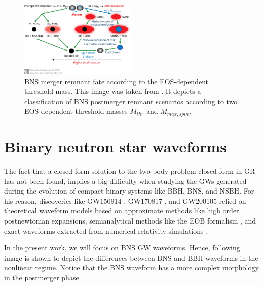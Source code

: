 \begin{figure}[hbt!]
\begin{center}
\includegraphics[width=0.5\textwidth, angle=0]{images/shi.jpeg}
\captionsetup{width=0.8\textwidth}
\caption[BNS merger remnant fate according to the EOS-dependent threshold mass]{BNS merger remnant fate according to the EOS-dependent threshold mass. This image was taken from \cite{Shibata:2019wef}. It depicts a classification of BNS postmerger remnant scenarios according to two EOS-dependent threshold masses $M_{thr}$ and $M_{max,spin}$.}
\label{BNS-out}
\end{center}
\end{figure}
\FloatBarrier

\newpage

\section{Binary neutron star waveforms}

The fact that a closed-form solution to the two-body problem closed-form in GR has not been found, implies a big difficulty when studying the GWs generated during the evolution of compact binary systems like BBH, BNS, and NSBH. For his reason, discoveries like GW150914 \cite{LIGOScientific:2016aoc}, GW170817 \cite{LIGOScientific:2017vwq}, and GW200105 \cite{LIGOScientific:2021qlt} relied on theoretical waveform models based on approximate methods like high order postnewtonian expansions, semianalytical methods like the  EOB formalism \cite{PhysRevD.96.121501,Dietrich:2018uni}, and exact waveforms extracted from numerical relativity simulations \cite{Bishop:2016lgv}.


In the present work, we will focus on BNS GW waveforms. Hence, following image is shown to depict the differences between BNS and BBH waveforms in the nonlinear regime. Notice that the BNS waveform has a more complex morphology in the postmerger phase.

